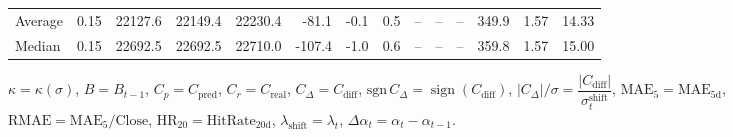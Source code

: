 \begin{threeparttable}
{\begin{tabular}{lrrrrrrrrrrrrr}
Average &     0.15 & 22127.6 & 22149.4 & 22230.4 &      -81.1 &                     -0.1 &                 0.5 &         -- &        -- &             -- &            349.9 &            1.57 &                  14.33 \\
 Median &     0.15 & 22692.5 & 22692.5 & 22710.0 &     -107.4 &                     -1.0 &                 0.6 &         -- &        -- &             -- &            359.8 &            1.57 &                  15.00 \\
\bottomrule
\end{tabular}
}
\begin{tablenotes}\footnotesize
\item $\kappa=\kappa(\sigma)$, $B=B_{t-1}$, $C_p=C_{\text{pred}}$, $C_r=C_{\text{real}}$, $C_\Delta=C_{\text{diff}}$, $\mathrm{sgn}\,C_\Delta=\operatorname{sign}(C_{\text{diff}})$, $|C_\Delta|/\sigma=\dfrac{|C_{\text{diff}}|}{\sigma_t^{\text{shift}}}$, $\mathrm{MAE}_5=\mathrm{MAE}_{5\text{d}}$, $\mathrm{RMAE}= \mathrm{MAE}_5 / \text{Close}$, $\mathrm{HR}_{20}=\mathrm{HitRate}_{20\text{d}}$, 
$\lambda_{\text{shift}}=\lambda_t$, 
$\Delta\alpha_t=\alpha_t-\alpha_{t-1}$.
\end{tablenotes}
\end{threeparttable}
\endgroup

